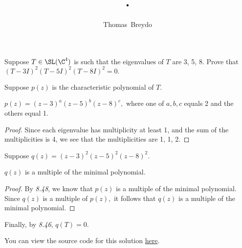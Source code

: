 \documentclass{amsart}
\title{\pagenum.\probnum}
\author{Thomas\ Breydo}
\newcommand{\pagenum}{267}
\newcommand{\probnum}{1}
\begin{document}
\maketitle

\begin{problem*}
Suppose $T\in\SL(\C^4)$ is such that the eigenvalues of $T$ are
3, 5, 8. Prove that $(T-3I)^2(T-5I)^2(T-8I)^2=0.$
\end{problem*}

\vspace{0.5in}

Suppose $p(z)$ is the characteristic polynomial of $T.$

\begin{claim*}
$p(z)=(z-3)^a(z-5)^b(z-8)^c,$ where one of $a,b,c$ equals 2 and the others
equal 1.
\end{claim*}
\begin{proof}
Since each eigenvalue has multiplicity at least 1, and the sum of the
multiplicities is 4, we see that the multiplicities are 1, 1, 2.
\end{proof}

Suppose $q(z)=(z-3)^2(z-5)^2(z-8)^2.$

\begin{claim*}
    $q(z)$ is a multiple of the minimal polynomial.
\end{claim*}
\begin{proof}
By \textit{8.48}, we know that $p(z)$ is a multiple of the
minimal polynomial. Since $q(z)$ is a multiple of $p(z),$
it follows that $q(z)$ is a multiple of the minimal polynomial.
\end{proof}

Finally, by \textit{8.46}, $q(T)=0.$

\vspace{0.5in}

\begin{note*}
You can view the source code for this solution
\href{https://github.com/thomasbreydo/linalg/blob/main/\pagenum_\probnum_Thomas_Breydo.tex}
{here}.
\end{note*}
\end{document}
